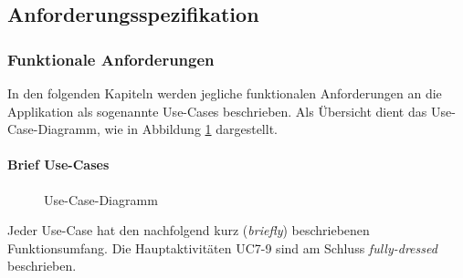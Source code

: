 \subsection{Anforderungsspezifikation}

\subsubsection{Funktionale Anforderungen}
In den folgenden Kapiteln werden jegliche funktionalen Anforderungen an die Applikation als sogenannte Use-Cases beschrieben. Als Übersicht dient das Use-Case-Diagramm, wie in Abbildung \ref{fig:ucmethode-635} dargestellt.

\paragraph{Brief Use-Cases}


\begin{figure}[h]
	\centering
	\caption{Use-Case-Diagramm}
	\label{fig:ucmethode-635}
\end{figure}

Jeder Use-Case hat den nachfolgend kurz (\textit{briefly}) beschriebenen  Funktionsumfang. Die Hauptaktivitäten UC7-9 sind am Schluss \textit{fully-dressed} beschrieben.

